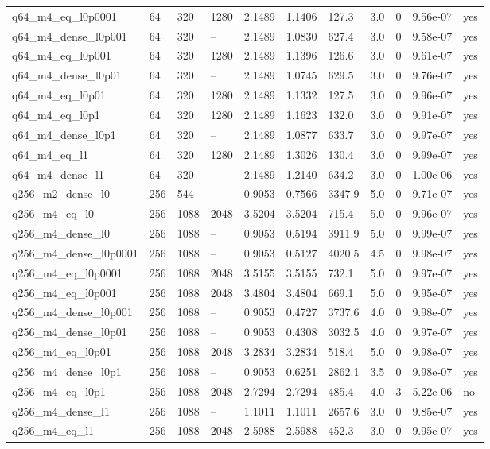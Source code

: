\documentclass[11pt]{article}
\begin{document}
\begin{table}[htbp]
\begin{tabular}{lllllllllll}
q64\_m4\_eq\_l0p0001 & 64 & 320 & 1280 & 2.1489 & 1.1406 & 127.3 & 3.0 & 0 & 9.56e-07 & yes \\
q64\_m4\_dense\_l0p001 & 64 & 320 & -- & 2.1489 & 1.0830 & 627.4 & 3.0 & 0 & 9.58e-07 & yes \\
q64\_m4\_eq\_l0p001 & 64 & 320 & 1280 & 2.1489 & 1.1396 & 126.6 & 3.0 & 0 & 9.61e-07 & yes \\
q64\_m4\_dense\_l0p01 & 64 & 320 & -- & 2.1489 & 1.0745 & 629.5 & 3.0 & 0 & 9.76e-07 & yes \\
q64\_m4\_eq\_l0p01 & 64 & 320 & 1280 & 2.1489 & 1.1332 & 127.5 & 3.0 & 0 & 9.96e-07 & yes \\
q64\_m4\_eq\_l0p1 & 64 & 320 & 1280 & 2.1489 & 1.1623 & 132.0 & 3.0 & 0 & 9.91e-07 & yes \\
q64\_m4\_dense\_l0p1 & 64 & 320 & -- & 2.1489 & 1.0877 & 633.7 & 3.0 & 0 & 9.97e-07 & yes \\
q64\_m4\_eq\_l1 & 64 & 320 & 1280 & 2.1489 & 1.3026 & 130.4 & 3.0 & 0 & 9.99e-07 & yes \\
q64\_m4\_dense\_l1 & 64 & 320 & -- & 2.1489 & 1.2140 & 634.2 & 3.0 & 0 & 1.00e-06 & yes \\
q256\_m2\_dense\_l0 & 256 & 544 & -- & 0.9053 & 0.7566 & 3347.9 & 5.0 & 0 & 9.71e-07 & yes \\
q256\_m4\_eq\_l0 & 256 & 1088 & 2048 & 3.5204 & 3.5204 & 715.4 & 5.0 & 0 & 9.96e-07 & yes \\
q256\_m4\_dense\_l0 & 256 & 1088 & -- & 0.9053 & 0.5194 & 3911.9 & 5.0 & 0 & 9.99e-07 & yes \\
q256\_m4\_dense\_l0p0001 & 256 & 1088 & -- & 0.9053 & 0.5127 & 4020.5 & 4.5 & 0 & 9.98e-07 & yes \\
q256\_m4\_eq\_l0p0001 & 256 & 1088 & 2048 & 3.5155 & 3.5155 & 732.1 & 5.0 & 0 & 9.97e-07 & yes \\
q256\_m4\_eq\_l0p001 & 256 & 1088 & 2048 & 3.4804 & 3.4804 & 669.1 & 5.0 & 0 & 9.95e-07 & yes \\
q256\_m4\_dense\_l0p001 & 256 & 1088 & -- & 0.9053 & 0.4727 & 3737.6 & 4.0 & 0 & 9.98e-07 & yes \\
q256\_m4\_dense\_l0p01 & 256 & 1088 & -- & 0.9053 & 0.4308 & 3032.5 & 4.0 & 0 & 9.97e-07 & yes \\
q256\_m4\_eq\_l0p01 & 256 & 1088 & 2048 & 3.2834 & 3.2834 & 518.4 & 5.0 & 0 & 9.98e-07 & yes \\
q256\_m4\_dense\_l0p1 & 256 & 1088 & -- & 0.9053 & 0.6251 & 2862.1 & 3.5 & 0 & 9.98e-07 & yes \\
q256\_m4\_eq\_l0p1 & 256 & 1088 & 2048 & 2.7294 & 2.7294 & 485.4 & 4.0 & 3 & 5.22e-06 & no \\
q256\_m4\_dense\_l1 & 256 & 1088 & -- & 1.1011 & 1.1011 & 2657.6 & 3.0 & 0 & 9.85e-07 & yes \\
q256\_m4\_eq\_l1 & 256 & 1088 & 2048 & 2.5988 & 2.5988 & 452.3 & 3.0 & 0 & 9.95e-07 & yes \\
\hline\end{tabular}
\end{table}
\end{document}
